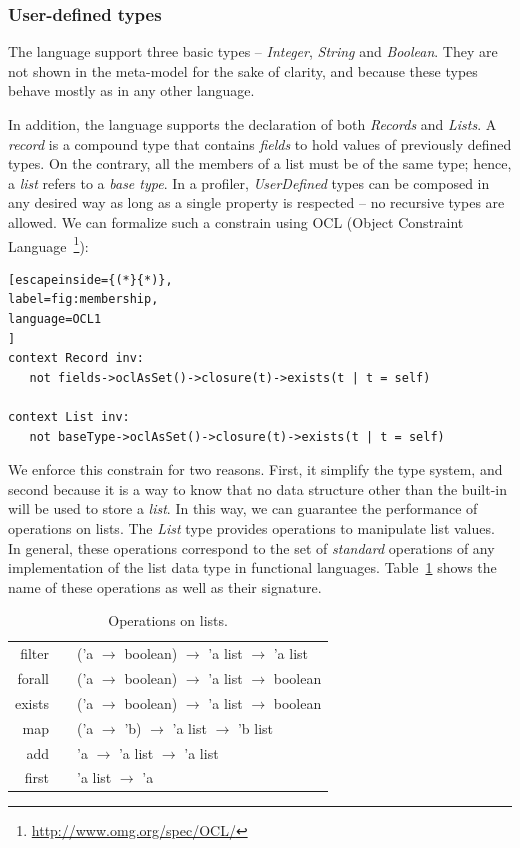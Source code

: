 \subsubsection*{User-defined types}
The language support three basic types -- \textit{Integer}, \textit{String} and \textit{Boolean}.
They are not shown in the meta-model for the sake of clarity, and because these types behave mostly as in any other language.

In addition, the language supports the declaration of both \textit{Records} and \textit{Lists}.
A \textit{record} is a compound type that contains \textit{fields} to hold values of previously defined types.
On the contrary,  all the members of a list must be of the same type; hence, a \textit{list} refers to a \textit{base type}.
In a profiler, \textit{UserDefined} types can be composed in any desired way as long as a single property is respected -- no recursive types are allowed.
We can formalize such a constrain using OCL (Object Constraint Language~\footnote{\url{http://www.omg.org/spec/OCL/}}):

\begin{lstlisting}[escapeinside={(*}{*)},
label=fig:membership,
language=OCL1
]
context Record inv: 
   not fields->oclAsSet()->closure(t)->exists(t | t = self)

context List inv:
   not baseType->oclAsSet()->closure(t)->exists(t | t = self)
\end{lstlisting} 

We enforce this constrain for two reasons. First, it simplify the type system, and second because it is a way to know that no data structure other than the built-in will be used to store a \textit{list}.
In this way, we can guarantee the performance of operations on lists.  
The \textit{List} type provides operations to manipulate list values.
In general, these operations correspond to the set of \textit{standard} operations of any implementation of the list data type in functional languages.
Table~\ref{tab:operations-on-lists} shows the name of these operations as well as their signature.

\begin{table}[!ht]
\centering
\begin{tabular}{r p{0.5cm} l}
\hline
\hline filter & & ('a $\to$ boolean) $\to$ 'a list $\to$ 'a list \\ 
forall & & ('a $\to$ boolean) $\to$ 'a list $\to$ boolean \\ 
exists & & ('a $\to$ boolean) $\to$ 'a list $\to$ boolean \\ 
map & & ('a $\to$ 'b) $\to$ 'a list $\to$ 'b list \\ 
add & & 'a $\to$ 'a list $\to$ 'a list \\ 
first & & 'a list $\to$ 'a \\
\hline 
\end{tabular} 
\caption{Operations on lists.} \label{tab:operations-on-lists}
\end{table} 


